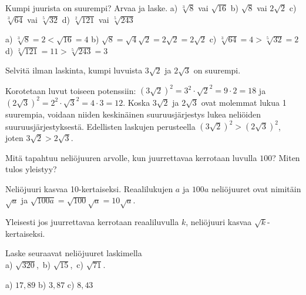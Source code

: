 \begin{tehtavasivu}
\begin{tehtava} Kumpi juurista on suurempi? Arvaa ja laske.
a) $\sqrt[3]{8}$ vai $\sqrt{16}$ \quad b)  $\sqrt{8}$ vai $2\sqrt{2}$  \quad c) $\sqrt[3]{64}$ vai $\sqrt[5]{32}$ \quad d) $\sqrt[2]{121}$ vai $\sqrt[5]{243}$ 
\begin{vastaus}
a) $\sqrt[3]{8}=2<\sqrt{16}=4$ \quad b) $\sqrt{8}=\sqrt{4}\sqrt{2}=2\sqrt{2} = 2\sqrt{2}$ \quad c) $\sqrt[3]{64}=4>\sqrt[5]{32}=2$ \quad d) $\sqrt[2]{121}=11 >\sqrt[5]{243}=3$ 
\end{vastaus}
\end{tehtava}


\begin{tehtava}
        Selvitä ilman laskinta, kumpi luvuista $3\sqrt{2}$ ja $2\sqrt{3}$ on suurempi. 
       
        \begin{vastaus}
        Korotetaan luvut toiseen potenssiin: $(3\sqrt{2})^2=3^2\cdot\sqrt{2}^2=9 \cdot 2=18$ ja $(2\sqrt{3})^2=2^2\cdot\sqrt{3}^2=4 \cdot 3=12$. Koska $3\sqrt{2}$ ja $2\sqrt{3}$ ovat molemmat lukua 1 suurempia, voidaan niiden keskinäinen suuruusjärjestys lukea neliöiden suuruusjärjestyksestä. Edellisten laskujen perusteella $(3\sqrt{2})^2 > (2\sqrt{3})^2$, joten $3\sqrt{2} > 2\sqrt{3}$.
        \end{vastaus}
\end{tehtava}

\begin{tehtava}
Mitä tapahtuu neliöjuuren arvolle, kun juurrettavaa kerrotaan luvulla $100$? Miten tulos yleistyy?
       
        \begin{vastaus}
        Neliöjuuri kasvaa 10-kertaiseksi. Reaalilukujen $a$ ja $100a$ neliöjuuret ovat nimitäin $\sqrt{a}$ ja $\sqrt{100a}=\sqrt{100}\sqrt{a}=10\sqrt{a}$.
        
        Yleisesti jos juurrettavaa kerrotaan reaaliluvulla $k$, neliöjuuri kasvaa $\sqrt{k}$-kertaiseksi.
        \end{vastaus}
\end{tehtava}

\begin{tehtava}
Laske seuraavat neliöjuuret laskimella\\
a) $\sqrt{320}$,\ b) $\sqrt{15}$,\ c) $\sqrt{71}$.
\begin{vastaus}
a) $17,89$ b) $3,87$ c) $8,43$
\end{vastaus}
\end{tehtava}


\end{tehtavasivu}
